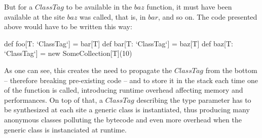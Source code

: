 But for a $ClassTag$ to be available in the $baz$ function, it must have been available at the site $baz$ was called, that is, in $bar$, and so on. The code presented above would have to be written this way:
 
\begin{lstlisting-nobreak}
  def foo[T: `ClassTag`] = bar[T]
  def bar[T: `ClassTag`] = baz[T]
  def baz[T: `ClassTag`] = new SomeCollection[T](10)
\end{lstlisting-nobreak}

As one can see, this creates the need to propagate the $ClassTag$ from the bottom -- therefore breaking pre-existing code -- and to store it in the stack each time one of the function is called, introducing runtime overhead affecting memory and performances. On top of that, a $ClassTag$ describing the type parameter has to be synthesized at each site a generic class is instantiated, thus producing many anonymous classes polluting the bytecode and even more overhead when the generic class is instanciated at runtime.  





